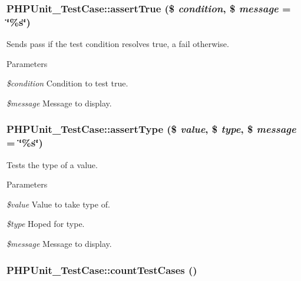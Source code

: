 \hypertarget{class_p_h_p_unit___test_case_a79026299eab938527a32d85e33f331fa}{
\subsubsection[{assertTrue}]{\setlength{\rightskip}{0pt plus 5cm}PHPUnit\_\-TestCase::assertTrue (\$ {\em condition}, \/  \$ {\em message} = {\ttfamily \char`\"{}\%s\char`\"{}})}}
\label{class_p_h_p_unit___test_case_a79026299eab938527a32d85e33f331fa}
Sends pass if the test condition resolves true, a fail otherwise. 
\begin{DoxyParams}{Parameters}
\item[{\em \$condition}]Condition to test true. \item[{\em \$message}]Message to display. \end{DoxyParams}
\hypertarget{class_p_h_p_unit___test_case_abe8fbcd84601418096c442315d165c81}{
\subsubsection[{assertType}]{\setlength{\rightskip}{0pt plus 5cm}PHPUnit\_\-TestCase::assertType (\$ {\em value}, \/  \$ {\em type}, \/  \$ {\em message} = {\ttfamily \char`\"{}\%s\char`\"{}})}}
\label{class_p_h_p_unit___test_case_abe8fbcd84601418096c442315d165c81}
Tests the type of a value. 
\begin{DoxyParams}{Parameters}
\item[{\em \$value}]Value to take type of. \item[{\em \$type}]Hoped for type. \item[{\em \$message}]Message to display. \end{DoxyParams}
\hypertarget{class_p_h_p_unit___test_case_a4d4116898093e6b3985a8f99f95d2296}{
\subsubsection[{countTestCases}]{\setlength{\rightskip}{0pt plus 5cm}PHPUnit\_\-TestCase::countTestCases ()}}
\label{class_p_h_p_unit___test_case_a4d4116898093e6b3985a8f99f95d2296}
